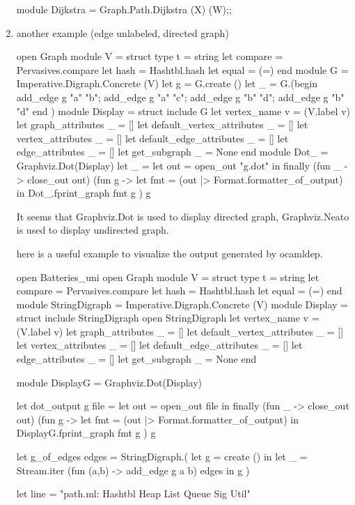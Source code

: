 \begin{enumerate}
\begin{bluetext}
module Dijkstra = Graph.Path.Dijkstra (X) (W);;
  
\end{bluetext}
\item another example (edge unlabeled, directed graph) 

  \begin{ocamlcode}
open Graph 
module V = struct
  type t = string
  let compare = Pervasives.compare
  let hash = Hashtbl.hash
  let equal = (=)
end
module G = Imperative.Digraph.Concrete (V)
let g = G.create ()
let _ = G.(begin 
  add_edge g "a" "b";
  add_edge g "a" "c";
  add_edge g "b" "d";
  add_edge g "b" "d"
end )
module Display = struct 
  include G
  let vertex_name v = (V.label v)
  let graph_attributes _ = []
  let default_vertex_attributes _ = []
  let vertex_attributes _ = []
  let default_edge_attributes _ = []
  let edge_attributes _ = []
  let get_subgraph _ = None
end 
module Dot_ = Graphviz.Dot(Display)
let _ = 
  let out = open_out "g.dot" in
  finally (fun _ -> close_out out) (fun g -> 
    let fmt =
      (out |> Format.formatter_of_output) in 
    Dot_.fprint_graph fmt g ) g
  \end{ocamlcode}
  It seems that Graphviz.Dot is used to display directed graph, Graphviz.Neato is used to display undirected graph.

  here is a useful example to visualize the output generated by ocamldep.
  \begin{ocamlcode}
open Batteries_uni 
open Graph 
module V = struct
  type t = string
  let compare = Pervasives.compare
  let hash = Hashtbl.hash
  let equal = (=)
end
module StringDigraph = Imperative.Digraph.Concrete (V)
module Display = struct 
  include StringDigraph
  open StringDigraph
  let vertex_name v = (V.label v)
  let graph_attributes _ = []
  let default_vertex_attributes _ = []
  let vertex_attributes _ = []
  let default_edge_attributes _ = []
  let edge_attributes _ = []
  let get_subgraph _ = None
end 

module DisplayG = Graphviz.Dot(Display)


let dot_output g file = 
  let out = open_out file in
  finally (fun _ -> close_out out) (fun g -> 
    let fmt =
      (out |> Format.formatter_of_output) in 
    DisplayG.fprint_graph fmt g ) g


let g_of_edges edges = StringDigraph.(
  let g = create () in 
  let _ = Stream.iter (fun (a,b) -> add_edge g a  b) edges in
  g 
)

let line = "path.ml: Hashtbl Heap List Queue Sig Util"


\end{ocamlcode}
\end{enumerate}

